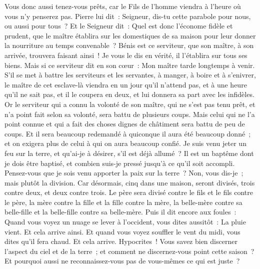 \begin{multicols}{2}
Vous donc aussi tenez-vous prêts, car le Fils de l'homme viendra à l'heure où vous n'y penserez pas.
Pierre lui dit~: Seigneur, dis-tu cette parabole pour nous, ou aussi pour tous~?
Et le Seigneur dit~: Quel est donc l'économe fidèle et prudent, que le maître établira sur les domestiques de sa maison pour leur donner la nourriture au temps convenable~?
Bénis est ce serviteur, que son maître, à son arrivée, trouvera faisant ainsi~!
Je vous le dis en vérité, il l'établira sur tous ses biens.
Mais si ce serviteur dit en son cœur~: Mon maître tarde longtemps à venir. S'il se met à battre les serviteurs et les servantes, à manger, à boire et à s'enivrer,
le maître de cet esclave-là viendra en un jour qu'il n'attend pas, et à une heure qu'il ne sait pas, et il le coupera en deux, et lui donnera sa part avec les infidèles.
Or le serviteur qui a connu la volonté de son maître, qui ne s'est pas tenu prêt, et n'a point fait selon sa volonté, sera battu de plusieurs coups.
 Mais celui qui ne l'a point connue et qui a fait des choses dignes de châtiment sera battu de peu de coups. Et il sera beaucoup redemandé à quiconque il aura été beaucoup donné~; et on exigera plus de celui à qui on aura beaucoup confié.
Je suis venu jeter un feu sur la terre, et qu'ai-je à désirer, s'il est déjà allumé~?
Il est un baptême dont je dois être baptisé, et combien suis-je pressé jusqu'à ce qu'il soit accompli.
Pensez-vous que je sois venu apporter la paix sur la terre~? Non, vous dis-je~; mais plutôt la division.
Car désormais, cinq dans une maison, seront divisés, trois contre deux, et deux contre trois.
Le père sera divisé contre le fils et le fils contre le père, la mère contre la fille et la fille contre la mère, la belle-mère contre sa belle-fille et la belle-fille contre sa belle-mère.
Puis il dit encore aux foules~: Quand vous voyez un nuage se lever à l'occident, vous dites aussitôt~: La pluie vient. Et cela arrive ainsi.
Et quand vous voyez souffler le vent du midi, vous dites qu'il fera chaud. Et cela arrive.
Hypocrites~! Vous savez bien discerner l'aspect du ciel et de la terre~; et comment ne discernez-vous point cette saison~?
Et pourquoi aussi ne reconnaissez-vous pas de vous-mêmes ce qui est juste~?

\end{multicols}
